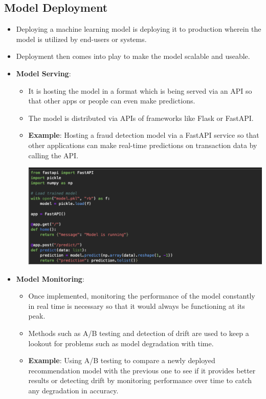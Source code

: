 \documentclass{article}
\begin{document}
\subsection{Model Deployment}
\begin{itemize}
\item Deploying a machine learning model is deploying it to production wherein the model is utilized by end-users or systems.
\item Deployment then comes into play to make the model scalable and useable.
\item \textbf{Model Serving}: 
\begin{itemize}
\item It is hosting the model in a format which is being served via an API so that other apps or people can even make predictions.
\item The model is distributed via APIs of frameworks like Flask or FastAPI.
\item \textbf{Example}: Hosting a fraud detection model via a FastAPI service so that other applications can make real-time predictions on transaction data by calling the API.

\includegraphics[width=14cm,height=6
cm]{Model.png}
\end{itemize}
\item \textbf{Model Monitoring}:
\begin{itemize}
\item Once implemented, monitoring the performance of the model constantly in real time is necessary so that it would always be functioning at its peak.
\item Methods such as A/B testing and detection of drift are used to keep a lookout for problems such as model degradation with time.
\item \textbf{Example}: Using A/B testing to compare a newly deployed recommendation model with the previous one to see if it provides better results or detecting drift by monitoring performance over time to catch any degradation in accuracy.


\end{itemize}
\end{itemize}
\end{document}
